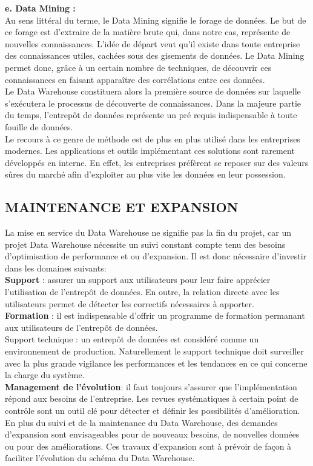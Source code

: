 \textbf{e. Data Mining :}\\
Au sens littéral du terme, le Data Mining signifie le forage de données. Le but de ce forage est d’extraire de la matière brute qui, dans notre cas, représente de nouvelles connaissances. L’idée de départ veut qu’il existe dans toute entreprise des connaissances utiles, cachées sous des gisements de données. Le Data Mining permet donc, grâce à un certain nombre de techniques, de découvrir ces connaissances en faisant apparaître des corrélations entre ces données.\\
Le Data Warehouse constituera alors la première source de données sur laquelle s’exécutera le processus de découverte de connaissances. Dans la majeure partie du temps, l’entrepôt de données représente un pré requis indispensable à toute fouille de données.\\
Le recours à ce genre de méthode est de plus en plus utilisé dans les entreprises modernes. Les applications et outils implémentant ces solutions sont rarement développés en interne. En effet, les entreprises préfèrent se reposer sur des valeurs sûres du marché afin d’exploiter au plus vite les données en leur possession.

 \subsection{MAINTENANCE ET EXPANSION}
 La mise en service du Data Warehouse ne signifie pas la fin du projet, car un projet
Data Warehouse nécessite un suivi constant compte tenu des besoins d’optimisation de performance et ou d’expansion. Il est donc nécessaire d’investir dans les domaines suivants:\\
\textbf{Support} : assurer un support aux utilisateurs pour leur faire apprécier l’utilisation de l’entrepôt de données. En outre, la relation directe avec les utilisateurs permet de détecter les  correctifs nécessaires à apporter.\\
\textbf{Formation} : il est indispensable d’offrir un programme de formation permanant aux utilisateurs de l’entrepôt de données.\\
Support technique : un entrepôt de données est considéré comme un environnement de production. Naturellement le support technique doit surveiller avec la plus grande vigilance les performances et les tendances en ce qui concerne la charge du système.\\
\textbf{Management de l’évolution}: il faut toujours s’assurer que l’implémentation répond aux besoins de l’entreprise. Les revues systématiques à certain point de contrôle sont un outil clé pour détecter et définir les possibilités d’amélioration. En plus du suivi et de la maintenance du Data Warehouse, des demandes d’expansion sont envisageables pour de nouveaux besoins, de nouvelles données ou pour des améliorations.
Ces travaux d’expansion sont à prévoir de façon à faciliter l’évolution du schéma du
Data Warehouse.




